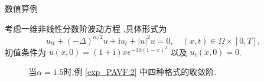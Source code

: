 \documentclass[aspectratio=169]{beamer}
\numberwithin{theorem}{section} %
\begin{document}
\begin{frame}{数值算例}
	\begin{example}\label{exp_PAVF:2}
		考虑一维非线性分数阶波动方程 ,具体形式为
		\begin{equation}\label{eq_PAVF:108}
		u_{t t}+(-\Delta)^{\alpha / 2} u+\mathrm{i}u_t+|u|^2 u=0, \quad (x,t)\in  \Omega\times[0, T],
		\end{equation}
		初值条件为 $u(x, 0)=(1+\mathrm{i}) x e^{-10(1-x)^2}$ 以及 $u_t(x, 0)=0$.
	\end{example}
\end{frame}

\begin{frame}%

	\begin{figure}[H]
		\begin{center}
		\caption{当$\alpha=1.5$时,例 \ref{exp_PAVF:2} 中四种格式的收敛阶.}
		 \label{fig_PAVF:1}
		\end{center}
		\end{figure}
\end{frame}
\end{document}
